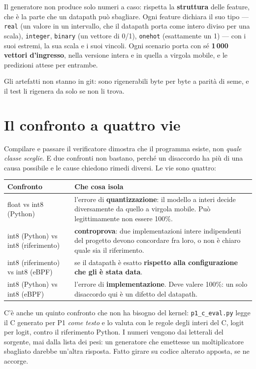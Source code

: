 \documentclass[11pt,a4paper,oneside]{report}
\begin{document}
Il generatore non produce solo numeri a caso: rispetta la \textbf{struttura}
delle feature, che è la parte che un datapath può sbagliare. Ogni feature
dichiara il suo tipo --- \texttt{real} (un valore in un intervallo, che il
datapath porta come intero diviso per una scala), \texttt{integer},
\texttt{binary} (un vettore di 0/1), \texttt{onehot} (esattamente un 1) --- con
i suoi estremi, la sua scala e i suoi vincoli. Ogni scenario porta con sé
\textbf{1\,000 vettori d'ingresso}, nella versione intera e in quella a virgola
mobile, e le predizioni attese per entrambe.

Gli artefatti non stanno in git: sono rigenerabili byte per byte a parità di
seme, e il test li rigenera da solo se non li trova.

\section{Il confronto a quattro vie}

Compilare e passare il verificatore dimostra che il programma esiste, non
\emph{quale classe sceglie}. E due confronti non bastano, perché un disaccordo
ha più di una causa possibile e le cause chiedono rimedi diversi. Le vie sono
quattro:

\begin{center}
\small
\begin{tabular}{@{}lp{8.4cm}@{}}
\toprule
\textbf{Confronto} & \textbf{Che cosa isola} \\
\midrule
float vs int8 (Python) &
  l'errore di \textbf{quantizzazione}: il modello a interi decide diversamente
  da quello a virgola mobile. Può legittimamente non essere 100\%. \\
int8 (Python) vs int8 (riferimento) &
  \textbf{controprova}: due implementazioni intere indipendenti del progetto
  devono concordare fra loro, o non è chiaro quale sia il riferimento. \\
int8 (riferimento) vs int8 (eBPF) &
  se il datapath è esatto \textbf{rispetto alla configurazione che gli è stata
  data}. \\
int8 (Python) vs int8 (eBPF) &
  l'errore di \textbf{implementazione}. Deve valere 100\%: un solo disaccordo
  qui è un difetto del datapath. \\
\bottomrule
\end{tabular}
\end{center}

C'è anche un quinto confronto che non ha bisogno del kernel:
\texttt{p1\_c\_eval.py} legge il C generato per P1 \emph{come testo} e lo valuta
con le regole degli interi del C, logit per logit, contro il riferimento Python.
I numeri vengono dai letterali del sorgente, mai dalla lista dei pesi: un
generatore che emettesse un moltiplicatore sbagliato darebbe un'altra risposta.
Fatto girare su codice alterato apposta, se ne accorge.
\end{document}
